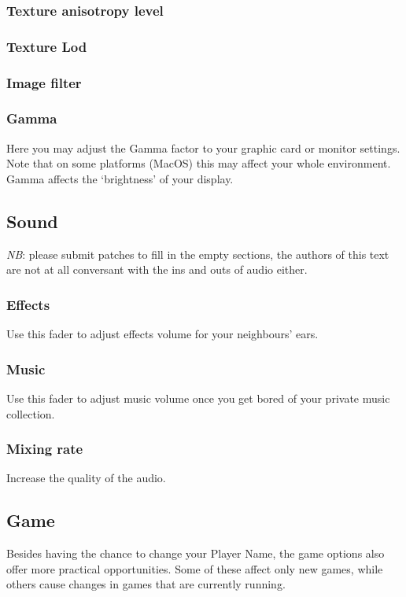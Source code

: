 \subsubsection*{Texture anisotropy level}
\subsubsection*{Texture Lod}
\subsubsection*{Image filter}
\subsubsection*{Gamma}
Here you may adjust the Gamma factor to your graphic card or monitor settings.  Note that on some platforms (MacOS) this may affect your whole environment.  Gamma affects the `brightness' of your display.

\subsection{Sound}

\emph{NB}: please submit patches to fill in the empty sections, the authors of this text are not at all conversant with the ins and outs of audio either.

\subsubsection*{Effects}
Use this fader to adjust effects volume for your neighbours' ears.

\subsubsection*{Music}
Use this fader to adjust music volume once you get bored of your private music collection.

\subsubsection*{Mixing rate}
Increase the quality of the audio.

\subsection{Game}
Besides having the chance to change your Player Name, the game options also offer more practical opportunities.  Some of these affect only new games, while others cause changes in games that are currently running.

